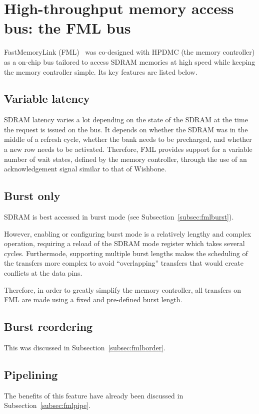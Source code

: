 \documentclass[a4paper,11pt]{kthesis}
\begin{document}
\section{High-throughput memory access bus: the FML bus}
FastMemoryLink (FML)~\cite{fml} was co-designed with HPDMC (the memory controller) as a on-chip bus tailored to access SDRAM memories at high speed while keeping the memory controller simple. Its key features are listed below.

\subsection{Variable latency}
SDRAM latency varies a lot depending on the state of the SDRAM at the time the request is issued on the bus. It depends on whether the SDRAM was in the middle of a refresh cycle, whether the bank needs to be precharged, and whether a new row needs to be activated. Therefore, FML provides support for a variable number of wait states, defined by the memory controller, through the use of an acknowledgement signal similar to that of Wishbone.

\subsection{Burst only}
SDRAM is best accessed in burst mode (see Subsection~\ref{subsec:fmlburst}).

However, enabling or configuring burst mode is a relatively lengthy and complex operation, requiring a reload of the SDRAM mode register which takes several cycles. Furthermode, supporting multiple burst lengths makes the scheduling of the transfers more complex to avoid ``overlapping'' transfers that would create conflicts at the data pins.

Therefore, in order to greatly simplify the memory controller, all transfers on FML are made using a fixed and pre-defined burst length.

\subsection{Burst reordering}
This was discussed in Subsection~\ref{subsec:fmlborder}.

\subsection{Pipelining}
The benefits of this feature have already been discussed in Subsection~\ref{subsec:fmlpipe}.
\end{document}
